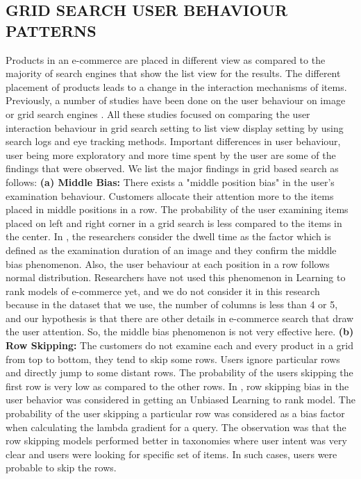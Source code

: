 \documentclass[11pt]{article}
\begin{document}
\subsection{GRID SEARCH USER BEHAVIOUR PATTERNS}
Products in an e-commerce are placed in different view as compared to the majority of search engines that show the list view for the results. The different placement of products leads to a change in the interaction mechanisms of items. Previously, a number of studies have been done on the user behaviour on image or grid search engines \cite{10.1145/3308558.3313514, 10.1145/3397271.3401146,10.1145/2072298.2072308}. All these studies focused on comparing the user interaction behaviour in grid search setting to list view display setting by using search logs and eye tracking methods. Important differences in user behaviour, user being more exploratory and more time spent by the user are some of the findings that were observed. We list the major findings in grid based search as follows:
\newline \textbf{(a) Middle Bias:} There exists a "middle position bias" in the user's examination behaviour. Customers allocate their attention more to the items placed in middle positions in a row. The probability of the user examining items placed on left and right corner in a grid search is less compared to the items in the center. In \cite{10.1145/3308558.3313514}, the researchers consider the dwell time as the factor which is defined as the examination duration of an image and they confirm the middle bias phenomenon. Also, the user behaviour at each position in a row follows normal distribution. Researchers have not used this phenomenon in Learning to rank models of e-commerce yet, and we do not consider it in this research because in the dataset that we use, the number of columns is less than 4 or 5, and our hypothesis is that there are other details in e-commerce search that draw the user attention. So, the middle bias phenomenon is not very effective here. 
\newline
\textbf{(b) Row Skipping:} The customers do not examine each and every product in a grid from top to bottom, they tend to skip some rows. Users ignore particular rows and directly jump to some distant rows. The probability of the users skipping the first row is very low as compared to the other rows. In \cite{10.1145/3394486.3403336}, row skipping bias in the user behavior was considered in getting an Unbiased Learning to rank model. The probability of the user skipping a particular row was considered as a bias factor when calculating the lambda gradient for a query. The observation was that the row skipping models performed better in taxonomies where user intent was very clear and users were looking for specific set of items. In such cases, users were probable to skip the rows.
\end{document}
